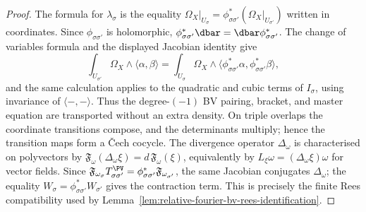 \begin{proof}
The formula for \(\lambda_\sigma\) is the equality
\(\Omega_X|_{U_\sigma}=\phi_{\sigma\sigma'}^*(\Omega_X|_{U_{\sigma'}})\)
written in coordinates. Since \(\phi_{\sigma\sigma'}\) is holomorphic,
\(\phi_{\sigma\sigma'}^*\dbar=\dbar\phi_{\sigma\sigma'}^*\). The change
of variables formula and the displayed Jacobian identity give
\[
 \int_{U_{\sigma'}}\Omega_X\wedge\langle\alpha,\beta\rangle
 =
 \int_{U_\sigma}\Omega_X\wedge
 \langle\phi_{\sigma\sigma'}^*\alpha,
        \phi_{\sigma\sigma'}^*\beta\rangle ,
\]
and the same calculation applies to the quadratic and cubic terms of
\(I_\sigma\), using invariance of \(\langle-,-\rangle\). Thus the
degree-\((-1)\) BV pairing, bracket, and master equation are
transported without an extra density. On triple overlaps the coordinate
transitions compose, and the determinants multiply; hence the
transition maps form a \v{C}ech cocycle. The divergence operator
\(\Delta_{\omega}\) is characterised on polyvectors by
\(\mathfrak F_\omega(\Delta_\omega\xi)=d\,\mathfrak F_\omega(\xi)\),
equivalently by \(L_\xi\omega=(\Delta_\omega\xi)\omega\) for vector
fields. Since
\(\mathfrak F_{\omega_\sigma}T_{\sigma\sigma'}^{\PV}
=\phi_{\sigma\sigma'}^*\mathfrak F_{\omega_{\sigma'}}\), the same
Jacobian conjugates \(\Delta_\omega\); the equality
\(W_\sigma=\phi_{\sigma\sigma'}^*W_{\sigma'}\) gives the contraction
term. This is precisely the finite Rees compatibility used by
Lemma~\ref{lem:relative-fourier-bv-rees-identification}.
\end{proof}


